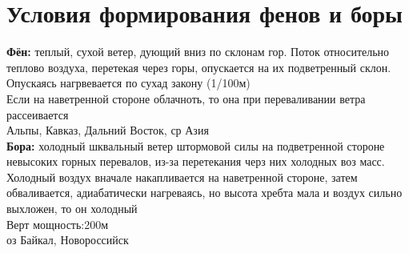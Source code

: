 
\section{Условия формирования фенов и боры}
\textbf{Фён:} теплый, сухой ветер, дующий вниз по склонам гор. Поток относительно теплово воздуха, перетекая через горы, опускается на их подветренный склон. Опускаясь нагрвевается по сухад закону (1/100м)\\
Если на наветренной стороне облачноть, то она при переваливании ветра рассеивается\\
Альпы, Кавказ, Дальний Восток, ср Азия\\

\textbf{Бора:} холодный шквальный ветер штормовой силы на подветренной стороне невысоких горных перевалов, из-за перетекания черз них холодных воз масс. Холодный воздух вначале накапливается на наветренной стороне, затем обваливается, адиабатически нагреваясь, но высота хребта мала и воздух сильно выхложен, то он холодный\\
Верт мощность:200м\\
оз Байкал, Новороссийск\\